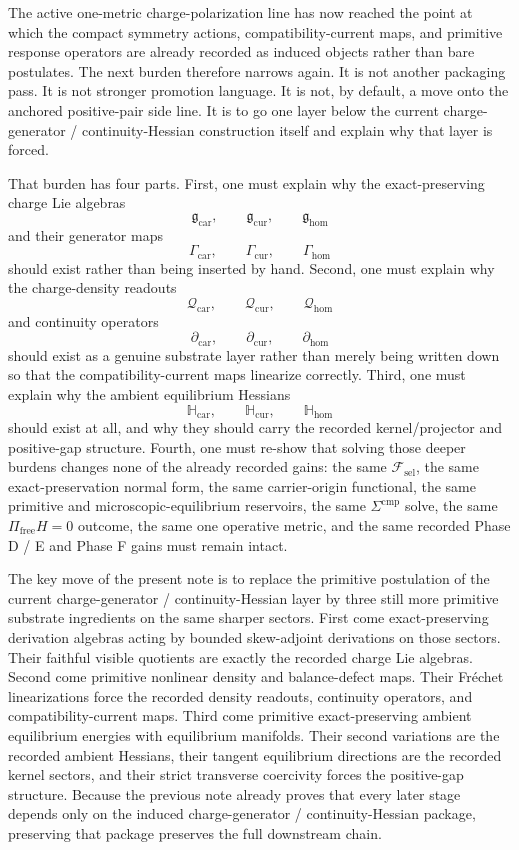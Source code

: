 \documentclass[11pt]{article}
\newcommand{\StemFunctional}{\mathscr F_{\mathrm{sel}}}
\newcommand{\TensorChargeAlg}{\mathfrak g_{\mathrm{car}}}
\newcommand{\CurChargeAlg}{\mathfrak g_{\mathrm{cur}}}
\newcommand{\HomChargeAlg}{\mathfrak g_{\mathrm{hom}}}
\newcommand{\TensorGen}{\Gamma_{\mathrm{car}}}
\newcommand{\CurGen}{\Gamma_{\mathrm{cur}}}
\newcommand{\HomGen}{\Gamma_{\mathrm{hom}}}
\newcommand{\TensorDensity}{\mathcal Q_{\mathrm{car}}}
\newcommand{\CurDensity}{\mathcal Q_{\mathrm{cur}}}
\newcommand{\HomDensity}{\mathcal Q_{\mathrm{hom}}}
\newcommand{\TensorCont}{\partial_{\mathrm{car}}}
\newcommand{\CurCont}{\partial_{\mathrm{cur}}}
\newcommand{\HomCont}{\partial_{\mathrm{hom}}}
\newcommand{\TensorAmbientHess}{\mathbb H_{\mathrm{car}}}
\newcommand{\CurAmbientHess}{\mathbb H_{\mathrm{cur}}}
\newcommand{\HomAmbientHess}{\mathbb H_{\mathrm{hom}}}
\begin{document}
The active one-metric charge-polarization line has now reached the point at which the compact symmetry actions, compatibility-current maps, and primitive response operators are already recorded as induced objects rather than bare postulates. The next burden therefore narrows again. It is not another packaging pass. It is not stronger promotion language. It is not, by default, a move onto the anchored positive-pair side line. It is to go one layer below the current charge-generator / continuity-Hessian construction itself and explain why that layer is forced.

That burden has four parts. First, one must explain why the exact-preserving charge Lie algebras
\[
\TensorChargeAlg,\qquad
\CurChargeAlg,\qquad
\HomChargeAlg
\]
and their generator maps
\[
\TensorGen,\qquad
\CurGen,\qquad
\HomGen
\]
should exist rather than being inserted by hand. Second, one must explain why the charge-density readouts
\[
\TensorDensity,\qquad
\CurDensity,\qquad
\HomDensity
\]
and continuity operators
\[
\TensorCont,\qquad
\CurCont,\qquad
\HomCont
\]
should exist as a genuine substrate layer rather than merely being written down so that the compatibility-current maps linearize correctly. Third, one must explain why the ambient equilibrium Hessians
\[
\TensorAmbientHess,\qquad
\CurAmbientHess,\qquad
\HomAmbientHess
\]
should exist at all, and why they should carry the recorded kernel/projector and positive-gap structure. Fourth, one must re-show that solving those deeper burdens changes none of the already recorded gains: the same \(\StemFunctional\), the same exact-preservation normal form, the same carrier-origin functional, the same primitive and microscopic-equilibrium reservoirs, the same \(\Sigma^{\mathrm{cmp}}\) solve, the same \(\Pi_{\mathrm{free}}H=0\) outcome, the same one operative metric, and the same recorded Phase D / E and Phase F gains must remain intact.

The key move of the present note is to replace the primitive postulation of the current charge-generator / continuity-Hessian layer by three still more primitive substrate ingredients on the same sharper sectors. First come exact-preserving derivation algebras acting by bounded skew-adjoint derivations on those sectors. Their faithful visible quotients are exactly the recorded charge Lie algebras. Second come primitive nonlinear density and balance-defect maps. Their Fr\'echet linearizations force the recorded density readouts, continuity operators, and compatibility-current maps. Third come primitive exact-preserving ambient equilibrium energies with equilibrium manifolds. Their second variations are the recorded ambient Hessians, their tangent equilibrium directions are the recorded kernel sectors, and their strict transverse coercivity forces the positive-gap structure. Because the previous note already proves that every later stage depends only on the induced charge-generator / continuity-Hessian package, preserving that package preserves the full downstream chain.
\end{document}
